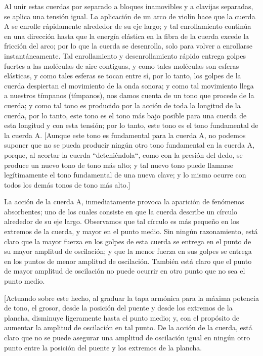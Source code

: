 \documentclass[12pt]{book}
\begin{document}
Al unir estas cuerdas por separado a bloques inamovibles y a clavijas separadas, se aplica una tensión igual. La aplicación de un arco de violín hace que la cuerda A se enrolle rápidamente alrededor de su eje largo; y tal enrollamiento continúa en una dirección hasta que la energía elástica en la fibra de la cuerda excede la fricción del arco; por lo que la cuerda se desenrolla, solo para volver a enrollarse instantáneamente. Tal enrollamiento y desenrollamiento rápido entrega golpes fuertes a las moléculas de aire contiguas, y como tales moléculas son esferas elásticas, y como tales esferas se tocan entre sí, por lo tanto, los golpes de la cuerda despiertan el movimiento de la onda sonora; y como tal movimiento llega a nuestros tímpanos (tímpanos), nos damos cuenta de un tono que procede de la cuerda; y como tal tono es producido por la acción de toda la longitud de la cuerda, por lo tanto, este tono es el tono más bajo posible para una cuerda de esta longitud y con esta tensión; por lo tanto, este tono es el tono fundamental de la cuerda A.
[Aunque este tono es fundamental para la cuerda A, no podemos suponer que no se pueda producir ningún otro tono fundamental en la cuerda A, porque, al acortar la cuerda ``deteniéndola``, como con la presión del dedo, se produce un nuevo tono de tono más alto; y tal nuevo tono puede llamarse legítimamente el tono fundamental de una nueva clave; y lo mismo ocurre con todos los demás tonos de tono más alto.]

La acción de la cuerda A, inmediatamente provoca la aparición de fenómenos absorbentes; uno de los cuales consiste en que la cuerda describe un círculo alrededor de su eje largo. Observamos que tal círculo es más pequeño en los extremos de la cuerda, y mayor en el punto medio. Sin ningún razonamiento, está claro que la mayor fuerza en los golpes de esta cuerda se entrega en el punto de su mayor amplitud de oscilación; y que la menor fuerza en sus golpes se entrega en los puntos de menor amplitud de oscilación. También está claro que el punto de mayor amplitud de oscilación no puede ocurrir en otro punto que no sea el punto medio.

[Actuando sobre este hecho, al graduar la tapa armónica para la máxima potencia de tono, el grosor, desde la posición del puente y desde los extremos de la plancha, disminuye ligeramente hasta el punto medio; y, con el propósito de aumentar la amplitud de oscilación en tal punto. De la acción de la cuerda, está claro que no se puede asegurar una amplitud de oscilación igual en ningún otro punto entre la posición del puente y los extremos de la plancha.
\end{document}
